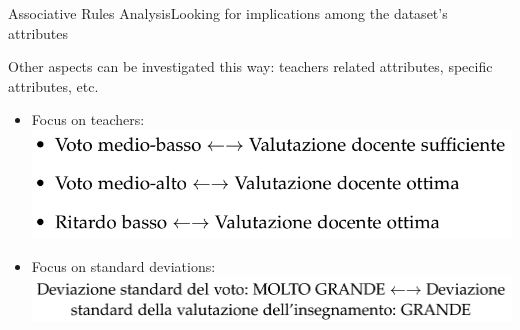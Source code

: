 \begin{frame}{Associative Rules Analysis}{Looking for implications among the dataset's attributes}

    Other aspects can be investigated this way: teachers related attributes, specific attributes, etc.

    \vspace{0.2cm}
	\begin{itemize}
		\item<1-> Focus on \alert{teachers}: \\ \vspace{0.2cm} \includegraphics[scale=0.28]{ass4.png}
		\item<2-> Focus on \alert{standard deviations}: \\ \vspace{0.2cm} \includegraphics[scale=0.28]{ass5.png}
	\end{itemize}

\end{frame}